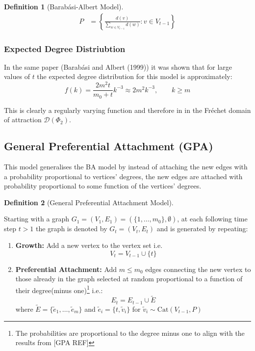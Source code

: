 \documentclass[
  10pt,
  a4paper,
]{scrreprt}
\providecommand{\tightlist}{%
  \setlength{\itemsep}{0pt}\setlength{\parskip}{0pt}}\usepackage{longtable,booktabs,array}
\theoremstyle{definition}
\newtheorem{definition}{Definition}[section]
\theoremstyle{plain}
\theoremstyle{remark}
\begin{document}
{\begin{definition}[Barabási-Albert
Model]
\begin{align*}
P &= \left\{\frac{d(v)}{\sum_{w\in V_{t-1}} d(w)} : v \in V_{t-1}\right\}
\end{align*}

\end{definition}

\hypertarget{expected-degree-distriubtion}{%
\subsubsection{Expected Degree
Distriubtion}\label{expected-degree-distriubtion}}

In the same paper (Barabási and Albert (1999)) it was shown that for
large values of \(t\) the expected degree distribution for this model is
approximately: \[
f(k) = \frac{2m^2t}{m_0+t}k^{-3} \approx 2m^2k^{-3},\qquad k\ge m
\]

This is clearly a regularly varying function and therefore in in the
Fréchet domain of attraction \(\mathcal D(\Phi_2)\).

\hypertarget{general-preferential-attachment-gpa}{%
\subsection{General Preferential Attachment
(GPA)}\label{general-preferential-attachment-gpa}}

This model generalises the BA model by instead of attaching the new
edges with a probability proportional to vertices' degrees, the new
edges are attached with probability proportional to some function of the
vertices' degrees.

\begin{definition}[General Preferential Attachment
Model]\protect\hypertarget{def-gpa}{}\label{def-gpa}

Starting with a graph
\(G_1 = (V_1, E_1) = (\{1,\ldots,m_0\}, \emptyset)\), at each following
time step \(t>1\) the graph is denoted by \(G_t = (V_t, E_t)\) and is
generated by repeating:

\begin{enumerate}
\def\labelenumi{\arabic{enumi}.}
\tightlist
\item
  \textbf{Growth:} Add a new vertex to the vertex set i.e. \[
  V_t = V_{t-1} \cup \{t\}
  \]
\item
  \textbf{Preferential Attachment:} Add \(m\le m_0\) edges connecting
  the new vertex to those already in the graph selected at random
  proportional to a function of their degree(minus one)\footnote{The
    probabilities are proportional to the degree minus one to align with
    the results from {[}GPA REF{]}} i.e.: \[
  E_t  = E_{t-1} \cup \tilde E
  \] where \(\tilde E = \{\tilde e_1,\ldots, \tilde e_m\}\) and
  \(\tilde e_i = \{t,\tilde v_i\}\) for
  \(\tilde v_i \sim \text{Cat}(V_{t-1}, P)\)
\end{enumerate}


\end{definition}}
\end{document}
